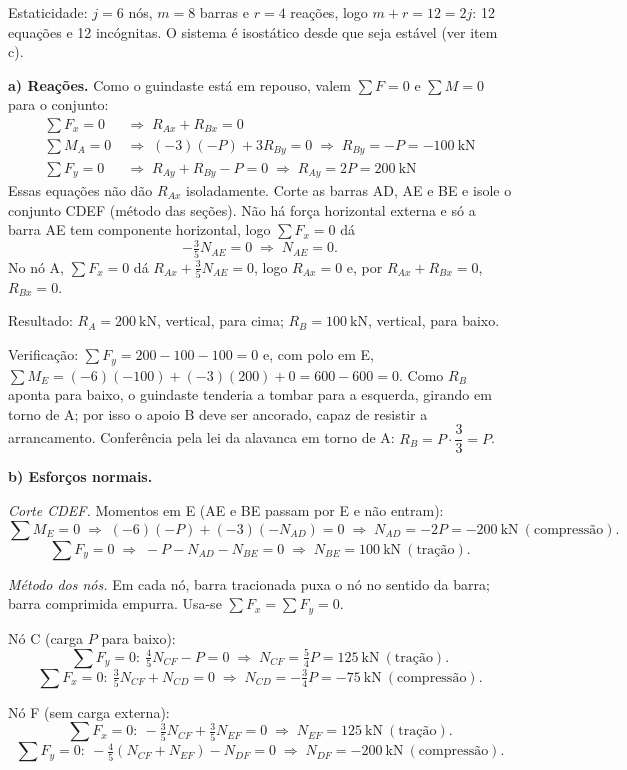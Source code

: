 \documentclass{article}%
\begin{document}
Estaticidade: $j=6$ nós, $m=8$ barras e $r=4$ reações, logo $m+r=12=2j$: 12 equações e 12 incógnitas. O sistema é isostático desde que seja estável (ver item c).

\textbf{a) Reações.} Como o guindaste está em repouso, valem $\sum F=0$ e $\sum M=0$ para o conjunto:
\begin{align*}
\sum F_x=0 &\;\Rightarrow\; R_{Ax}+R_{Bx}=0\\
\sum M_A=0 &\;\Rightarrow\; (-3)(-P)+3R_{By}=0 \;\Rightarrow\; R_{By}=-P=-100\ \text{kN}\\
\sum F_y=0 &\;\Rightarrow\; R_{Ay}+R_{By}-P=0 \;\Rightarrow\; R_{Ay}=2P=200\ \text{kN}
\end{align*}
Essas equações não dão $R_{Ax}$ isoladamente. Corte as barras AD, AE e BE e isole o conjunto CDEF (método das seções). Não há força horizontal externa e só a barra AE tem componente horizontal, logo $\sum F_x=0$ dá
\[
-\tfrac35N_{AE}=0\;\Rightarrow\;N_{AE}=0.
\]
No nó A, $\sum F_x=0$ dá $R_{Ax}+\tfrac35N_{AE}=0$, logo $R_{Ax}=0$ e, por $R_{Ax}+R_{Bx}=0$, $R_{Bx}=0$.

Resultado: $R_A=200\ \text{kN}$, vertical, para cima; $R_B=100\ \text{kN}$, vertical, para baixo.

Verificação: $\sum F_y=200-100-100=0$ e, com polo em E, $\sum M_E=(-6)(-100)+(-3)(200)+0=600-600=0$. Como $R_B$ aponta para baixo, o guindaste tenderia a tombar para a esquerda, girando em torno de A; por isso o apoio B deve ser ancorado, capaz de resistir a arrancamento. Conferência pela lei da alavanca em torno de A: $R_B=P\cdot\dfrac{3}{3}=P$.

\textbf{b) Esforços normais.}

\emph{Corte CDEF.} Momentos em E (AE e BE passam por E e não entram):
\[
\sum M_E=0\;\Rightarrow\;(-6)(-P)+(-3)(-N_{AD})=0\;\Rightarrow\;N_{AD}=-2P=-200\ \text{kN}\ (\text{compressão}).
\]
\[
\sum F_y=0\;\Rightarrow\;-P-N_{AD}-N_{BE}=0\;\Rightarrow\;N_{BE}=100\ \text{kN}\ (\text{tração}).
\]

\emph{Método dos nós.} Em cada nó, barra tracionada puxa o nó no sentido da barra; barra comprimida empurra. Usa-se $\sum F_x=\sum F_y=0$.

Nó C (carga $P$ para baixo):
\[
\sum F_y=0:\ \tfrac45N_{CF}-P=0\;\Rightarrow\;N_{CF}=\tfrac54P=125\ \text{kN}\ (\text{tração}).
\]
\[
\sum F_x=0:\ \tfrac35N_{CF}+N_{CD}=0\;\Rightarrow\;N_{CD}=-\tfrac34P=-75\ \text{kN}\ (\text{compressão}).
\]

Nó F (sem carga externa):
\[
\sum F_x=0:\ -\tfrac35N_{CF}+\tfrac35N_{EF}=0\;\Rightarrow\;N_{EF}=125\ \text{kN}\ (\text{tração}).
\]
\[
\sum F_y=0:\ -\tfrac45\left(N_{CF}+N_{EF}\right)-N_{DF}=0\;\Rightarrow\;N_{DF}=-200\ \text{kN}\ (\text{compressão}).
\]
\end{document}
